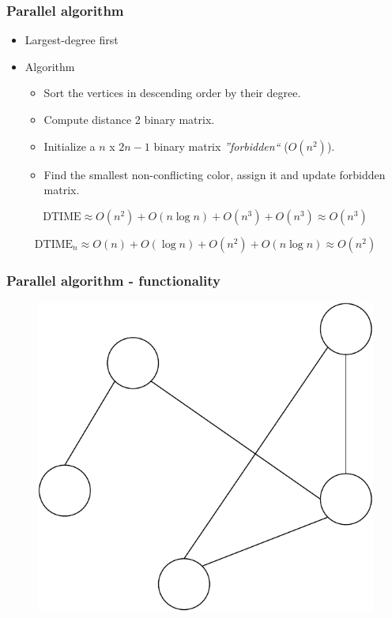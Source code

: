 \documentclass[11pt,xcolor=pdflatex]{beamer}
\begin{document}
\begin{frame}\frametitle{Parallel algorithm}

\begin{itemize}
   \item Largest-degree first
   \item Algorithm
   \begin{itemize}
      \item Sort the vertices in descending order by their degree.
      \item Compute distance 2 binary matrix.
      \item Initialize a $n$ x $2n - 1$ binary matrix \emph{''forbidden``} ($O(n^2)$).
      \item Find the smallest non-conflicting color, assign it and update forbidden matrix.
   \end{itemize}
\end{itemize}

$$\textrm{DTIME} \approx O(n^2) + O(n \log n) + O(n^3) + O(n^3) \approx O(n^3)$$
\vspace{-3.5em}

$$\textrm{DTIME}_n \approx O(n) + O(\log n) + O(n^2) + O(n \log n) \approx O(n^2)$$

\end{frame}


\begin{frame}\frametitle{Parallel algorithm - functionality}

\begin{figure}
   \includegraphics[width=0.6\linewidth]{graph_raw.pdf}
\end{figure}

\end{frame}
\end{document}
